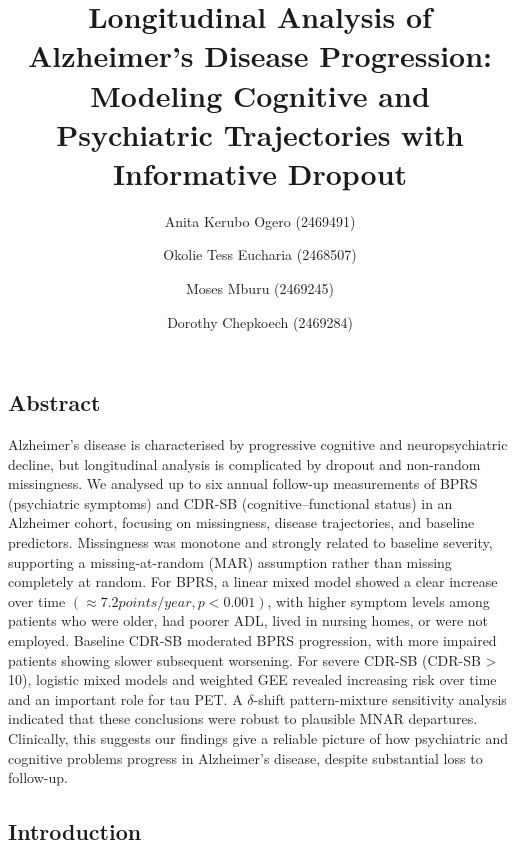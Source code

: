 \documentclass[
  9pt,
  letterpaper,
  DIV=11,
  numbers=noendperiod]{scrartcl}
\title{Longitudinal Analysis of Alzheimer's Disease Progression:
Modeling Cognitive and Psychiatric Trajectories with Informative
Dropout}
\author{Anita Kerubo Ogero (2469491) \and Okolie Tess Eucharia
(2468507) \and Moses Mburu (2469245) \and Dorothy Chepkoech (2469284)}
\date{}
\begin{document}
\maketitle


\subsection{Abstract}\label{abstract}

Alzheimer's disease is characterised by progressive cognitive and
neuropsychiatric decline, but longitudinal analysis is complicated by
dropout and non-random missingness. We analysed up to six annual
follow-up measurements of BPRS (psychiatric symptoms) and CDR-SB
(cognitive--functional status) in an Alzheimer cohort, focusing on
missingness, disease trajectories, and baseline predictors. Missingness
was monotone and strongly related to baseline severity, supporting a
missing-at-random (MAR) assumption rather than missing completely at
random. For BPRS, a linear mixed model showed a clear increase over time
\((\approx7.2 points/year, p < 0.001)\), with higher symptom levels
among patients who were older, had poorer ADL, lived in nursing homes,
or were not employed. Baseline CDR-SB moderated BPRS progression, with
more impaired patients showing slower subsequent worsening. For severe
CDR-SB (CDR-SB \textgreater{} 10), logistic mixed models and weighted
GEE revealed increasing risk over time and an important role for tau
PET. A \(\delta\)-shift pattern-mixture sensitivity analysis indicated
that these conclusions were robust to plausible MNAR departures.
Clinically, this suggests our findings give a reliable picture of how
psychiatric and cognitive problems progress in Alzheimer's disease,
despite substantial loss to follow-up.

\subsection{Introduction}\label{introduction}
\end{document}
